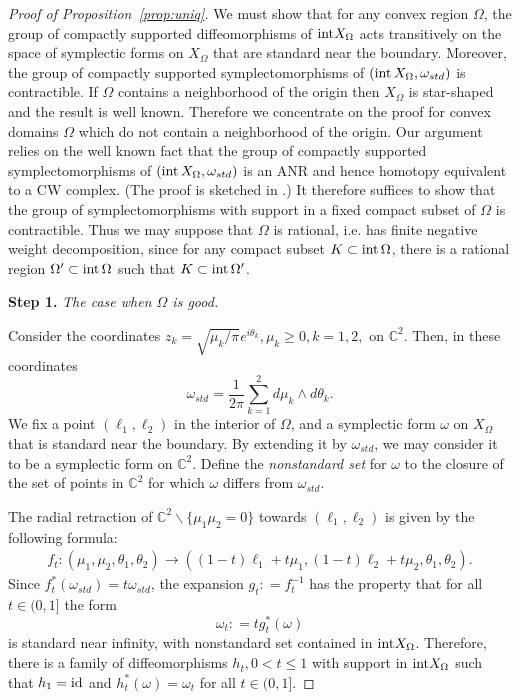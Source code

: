 \documentclass[11pt, reqno]{amsart}
\theoremstyle{remark}
\numberwithin{equation}{subsection}
\numberwithin{figure}{section}
\theoremstyle{customremark}
\newcommand{\intt}{{\rm int}}
\newcommand{\NI}{{\noindent}}
\newcommand{\Om}{{\Omega}}
\newcommand{\om}{{\omega}}
\newcommand{\less} {{\smallsetminus}}
\newcommand{\MS}{{\medskip}}
\newcommand{\C}{\mathbb{C}}
\newcommand{\comm}[1]{\marginpar{\tiny #1 }}
\begin{document}
\begin{proof}[Proof of Proposition~\ref{prop:uniq}]
We must show that for  any convex region $\Om$, the group of compactly supported diffeomorphisms of $\intt X_\Om$ acts transitively on
the space of symplectic forms on $X_\Om$ that are standard near the boundary. Moreover, 
the group of compactly supported symplectomorphisms of $(\intt\, X_\Om, \om_{std})$
 is contractible. 
If $\Om$ contains a neighborhood of the origin then $X_\Om$ is star-shaped and the result is well known.
Therefore we concentrate on the proof for convex domains $\Om$ which do not contain a neighborhood of the origin. 
Our argument relies on the well known fact that the group of compactly supported symplectomorphisms of $(\intt\, X_\Om, \om_{std})$
is an ANR and hence homotopy equivalent to a CW complex. (The proof is sketched in \cite[Rmk.9.5.5]{JHOL}.)  It therefore suffices to
show that the group of symplectomorphisms with support in a fixed compact subset of $\Om$ is contractible. 
Thus we may suppose
that $\Om$ is rational, i.e. has finite negative weight decomposition, since for any compact subset $K\subset \intt\,\Om$,
 there is a rational region $\Om'\subset \intt\,\Om$ such that $K \subset \intt\,\Om'$.
\MS

\NI {\bf Step 1.} {\it The case when $\Om$ is good.}


 Consider the coordinates $z_k = \sqrt{ \mu_k / \pi } e^{i \theta_k}, \mu_k\ge 0, k=1,2,$ on $\mathbb{C}^2$.  Then, in these coordinates
\[ 
\omega_{std} = \frac{1}{2 \pi} \sum^2_{k=1} d \mu_k \wedge d \theta_k.
\]
We fix a point $(\ell_1,\ell_2)$ in the interior of $\Omega$, and a symplectic form $\om$ on $X_\Om$ that is
 standard near the boundary. By extending it by $\om_{std}$, we may consider it to be a symplectic form on $\mathbb{C}^2$.
Define the {\em nonstandard set} for $\omega$ to the closure of the set of points in $\mathbb{C}^2$ for which $\omega$ differs from $\omega_{std}$.   

The 
 radial retraction of $\C^2 \less \{\mu_1\mu_2=0\}$ towards $(\ell_1,\ell_2)$ is given by
 the following formula:
 \begin{align}\label{eq:retract}
 f_t: (\mu_1, \mu_2, \theta_1, \theta_2) \to ( (1-t) \ell_1 + t \mu_1, (1-t) \ell_2 + t \mu_2, \theta_1, \theta_2).
 \end{align}
Since  $f_t^*(\omega_{std}) = t  \omega_{std}$,
 the expansion $g_t: = f_t^{-1}$ has the property that for all $t\in (0,1]$ the form
$$
\om_t: = t  g_t^*(\om)
$$
is standard near infinity, with nonstandard set  contained in $\intt X_\Om$. Therefore, there is a family of diffeomorphisms $h_t, 0<t\le 1$ with support in $\intt X_\Om$ such that $h_1 = \rm{id}$ and $h_t^*(\om) = \om_t$ for all $t\in (0,1]$. 


\end{proof}
\end{document}

